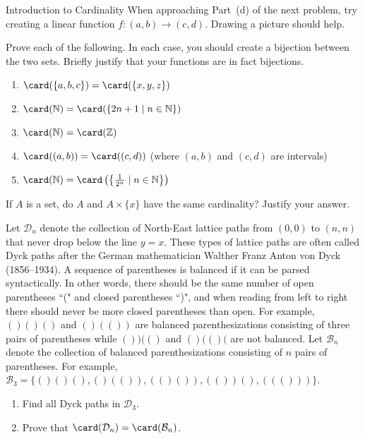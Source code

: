 \begin{section}{Introduction to Cardinality}
When approaching Part~(d) of the next problem, try creating a linear function $f:(a,b)\to (c,d)$. Drawing a picture should help.

\begin{problem}\label{prob:cardinalityPractice}
Prove each of the following. In each case, you should create a bijection between the two sets. Briefly justify that your functions are in fact bijections.
\begin{enumerate}[label=\textrm{(\alph*)}]
\item $\card(\{a,b,c\})=\card(\{x,y,z\})$
\item $\card(\mathbb{N})=\card(\{2n+1\mid n\in \mathbb{N}\})$
\item $\card(\mathbb{N})=\card(\mathbb{Z})$
\item $\card((a,b))=\card((c,d))$ (where $(a,b)$ and $(c,d)$ are intervals)
\item $\card(\mathbb{N})=\card\left(\left\{\frac{1}{2^n}\mid n\in \mathbb{N}\right\}\right)$
\end{enumerate}
\end{problem}

\begin{problem}
If $A$ is a set, do $A$ and $A\times \{x\}$ have the same cardinality?  Justify your answer.
\end{problem}

\begin{problem}
Let $\mathcal{D}_n$ denote the collection of North-East lattice paths from $(0,0)$ to $(n,n)$ that never drop below the line $y=x$.  These types of lattice paths are often called Dyck paths after the German mathematician Walther Franz Anton von Dyck (1856--1934). A sequence of parentheses is balanced if it can be parsed syntactically. In other words, there should be the same number of open parentheses ``(" and closed parentheses ``)", and when reading from left to right there should never be more closed parentheses than open. For example, $()()()$ and $()(())$ are balanced parenthesizations consisting of three pairs of parentheses while $())(()$ and $()(()($ are not balanced. Let $\mathcal{B}_n$ denote the collection of balanced parenthesizations consisting of $n$ pairs of parentheses.  For example, $\mathcal{B}_3=\{()()(), ()(()), (()()), (())(), ((()))\}$.
\begin{enumerate}[label=\textrm{(\alph*)}]
\item Find all Dyck paths in $\mathcal{D}_3$.
\item Prove that $\card(\mathcal{D}_n)=\card(\mathcal{B}_n)$.
\end{enumerate}
\end{problem}


\end{section}
